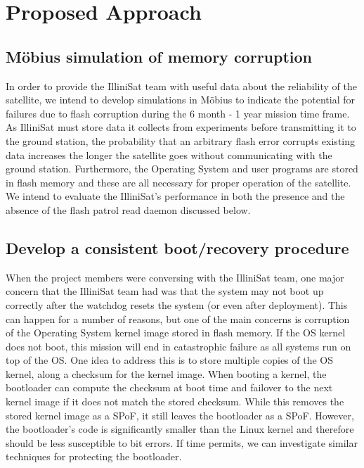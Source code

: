 \section{Proposed Approach}
\subsection{M\"obius simulation of memory corruption}
In order to provide the IlliniSat team with useful data about the reliability of
the satellite, we intend to develop simulations in M\"obius to indicate the
potential for failures due to flash corruption during the 6 month - 1 year
mission time frame.  As IlliniSat must store data it collects from experiments
before transmitting it to the ground station, the probability that an arbitrary
flash error corrupts existing data increases the longer the satellite goes
without communicating with the ground station.  Furthermore, the Operating
System and user programs are stored in flash memory and these are all necessary
for proper operation of the satellite.  We intend to evaluate the IlliniSat's
performance in both the presence and the absence of the flash patrol read daemon
discussed below.

\subsection{Develop a consistent boot/recovery procedure}
When the project members were conversing with the IlliniSat team, one major
concern that the IlliniSat team had was that the system may not boot up
correctly after the watchdog resets the system (or even after deployment).  This
can happen for a number of reasons, but one of the main concerns is corruption
of the Operating System kernel image stored in flash memory.  If the OS kernel
does not boot, this mission will end in catastrophic failure as all systems run
on top of the OS.  One idea to address this is to store multiple copies of the
OS kernel, along a checksum for the kernel image.  When booting a kernel, the
bootloader can compute the checksum at boot time and failover to the next kernel
image if it does not match the stored checksum.  While this removes the stored
kernel image as a SPoF, it still leaves the bootloader as a SPoF.  However, the
bootloader's code is significantly smaller than the Linux kernel and therefore
should be less susceptible to bit errors.  If time permits, we can investigate
similar techniques for protecting the bootloader. 

